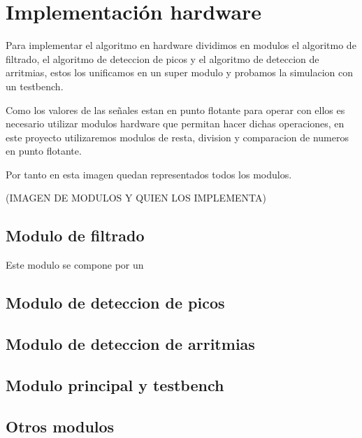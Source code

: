 \chapter{Implementación hardware}

Para implementar el algoritmo en hardware dividimos en modulos el algoritmo de filtrado, el algoritmo
de deteccion de picos y el algoritmo de deteccion de arritmias, estos los unificamos en un super modulo 
y probamos la simulacion con un testbench.

Como los valores de las señales estan en punto flotante para operar con ellos es necesario utilizar modulos
hardware que permitan hacer dichas operaciones, en este proyecto utilizaremos modulos de resta, division y 
comparacion de numeros en punto flotante.

Por tanto en esta imagen quedan representados todos los modulos.

(IMAGEN DE MODULOS Y QUIEN LOS IMPLEMENTA)

\section{Modulo de filtrado}

Este modulo se compone por un

\section{Modulo de deteccion de picos}

\section{Modulo de deteccion de arritmias}

\section{Modulo principal y testbench}

\section{Otros modulos}



